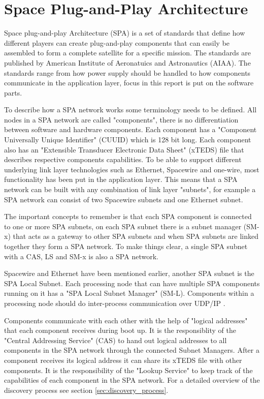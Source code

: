 \chapter{Space Plug-and-Play Architecture}\label{ch:spa}
Space plug-and-play Architecture (SPA) is a set of standards that define how
different players can create plug-and-play components that can easily be
assembled to form a complete satellite for a specific mission. The standards
are published by American Institute of Aeronatuics and Astronautics (AIAA). The
standards range from how power supply should be handled to how components
communicate in the application layer, focus in this report is put on the
software parts.

To describe how a SPA network works some terminology needs to be defined. All
nodes in a SPA network are called "components", there is no differentiation
between software and hardware components. Each component has a "Component
Universally Unique Identifier" (CUUID) which is 128 bit long. Each component
also has an "Extensible Transducer Electronic Data Sheet" (xTEDS) file that
describes respective components capabilities. To be able to support different
underlying link layer technologies such as Ethernet, Spacewire and one-wire,
most functionality has been put in the application layer. This means that a SPA
network can be built with any combination of link layer "subnets", for example
a SPA network can consist of two Spacewire subnets and one Ethernet subnet.


The important concepts to remember is that each SPA component is
connected to one or more SPA subnets, on each SPA subnet there is a subnet
manager (SM-x) that acts as a gateway to other SPA subnets and when SPA subnets
are linked together they form a SPA network. To make things clear, a single SPA
subnet with a CAS, LS and SM-x is also a SPA network.

Spacewire and Ethernet have been mentioned earlier, another SPA subnet is the
SPA Local Subnet. Each processing node that can have multiple SPA components
running on it has a "SPA Local Subnet Manager" (SM-L).  Components within a
processing node should do inter-process communication over UDP/IP
\cite{spa:local-subnet}.

Components communicate with each other with the help of "logical addresses"
that each component receives during boot up. It is the responsiblity of the
"Central Addressing Service" (CAS) to hand out logical addresses to all
components in the SPA network through the connected Subnet Managers. After a
component receives its logical address it can share its xTEDS file with other
components. It is the responsibility of the "Lookup Service" to keep track of
the capabilities of each component in the SPA network. For a detailed overview
of the discovery process see section \ref{sec:discovery_process}.


